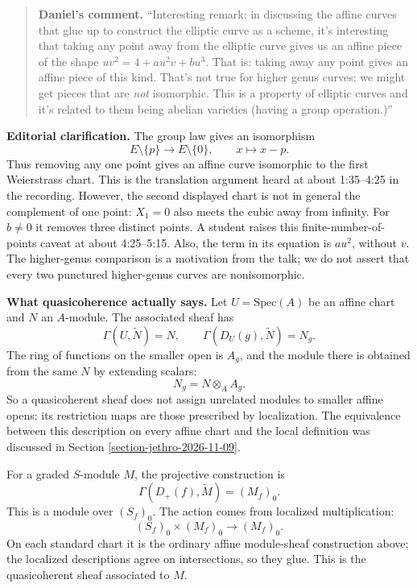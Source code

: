\begin{quote}
\textbf{Daniel's comment.}
``Interesting remark: in discussing the
 affine curves that glue up to construct
 the elliptic curve as a scheme, it's
 interesting that taking any point away
 from the elliptic curve gives us an affine
 piece of the shape
 $uv^2=4+au^2v+bu^3$. That is: taking away
 any point gives an affine piece of this
 kind. That's not true for higher genus
 curves: we might get pieces that are
 \textit{not} isomorphic. This is a property
 of elliptic curves and it's related to
 them being abelian varieties (having a
 group operation.)''
\end{quote}

\noindent
\textbf{Editorial clarification.} The group
law gives an isomorphism
$$
E\setminus\{p\}\longrightarrow
E\setminus\{0\},\qquad x\longmapsto x-p.
$$
Thus removing any one point gives an affine
curve isomorphic to the first Weierstrass
chart. This is the translation argument
heard at about 1:35--4:25 in the recording.
However, the second displayed chart is not
in general the complement of one point:
$X_1=0$ also meets the cubic away from
infinity. For $b\neq0$ it removes three
distinct points. A student raises this
finite-number-of-points caveat at about
4:25--5:15. Also, the term in its equation
is $au^2$, without $v$. The higher-genus
comparison is a motivation from the talk;
we do not assert that every two punctured
higher-genus curves are nonisomorphic.

\medskip\noindent
{\bf What quasicoherence actually says.}
Let $U=\mathrm{Spec}(A)$ be an affine chart
and $N$ an $A$-module. The associated sheaf
has
$$
\Gamma(U,\widetilde N)=N,\qquad
\Gamma(D_U(g),\widetilde N)=N_g.
$$
The ring of functions on the smaller open
is $A_g$, and the module there is obtained
from the same $N$ by extending scalars:
$$
N_g=N\otimes_A A_g.
$$
So a quasicoherent sheaf does not assign
unrelated modules to smaller affine opens:
its restriction maps are those prescribed
by localization. The equivalence between
this description on every affine chart and
the local definition was discussed in
Section \ref{section-jethro-2026-11-09}.

For a graded $S$-module $M$, the projective
construction is
$$
\Gamma(D_+(f),\widetilde M)=(M_f)_0.
$$
This is a module over $(S_f)_0$. The action
comes from localized multiplication:
$$
(S_f)_0\times(M_f)_0\longrightarrow(M_f)_0.
$$
On each standard chart it is the ordinary
affine module-sheaf construction above;
the localized descriptions agree on
intersections, so they glue. This is the
quasicoherent sheaf associated to $M$.


